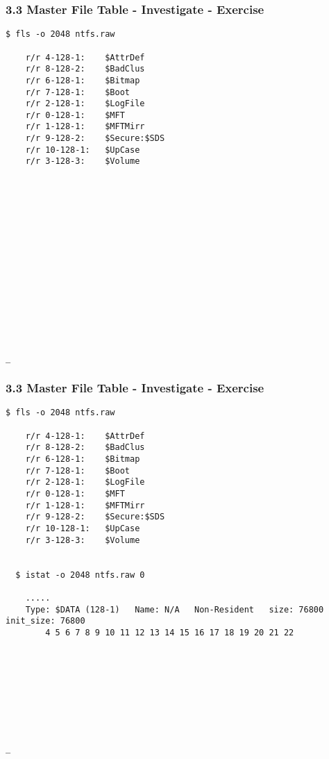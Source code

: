 \begin{frame}[fragile]
  \frametitle{3.3 Master File Table - Investigate - Exercise}
  \begin{lstlisting}[basicstyle=\tiny]
  $ fls -o 2048 ntfs.raw

	r/r 4-128-1:	$AttrDef
	r/r 8-128-2:	$BadClus
	r/r 6-128-1:	$Bitmap
	r/r 7-128-1:	$Boot
	r/r 2-128-1:	$LogFile
	r/r 0-128-1:	$MFT
	r/r 1-128-1:	$MFTMirr
	r/r 9-128-2:	$Secure:$SDS
	r/r 10-128-1:	$UpCase
	r/r 3-128-3:	$Volume
















_
  \end{lstlisting}
\end{frame}


\begin{frame}[fragile]
  \frametitle{3.3 Master File Table - Investigate - Exercise}
  \begin{lstlisting}[basicstyle=\tiny]
  $ fls -o 2048 ntfs.raw

	r/r 4-128-1:	$AttrDef
	r/r 8-128-2:	$BadClus
	r/r 6-128-1:	$Bitmap
	r/r 7-128-1:	$Boot
	r/r 2-128-1:	$LogFile
	r/r 0-128-1:	$MFT
	r/r 1-128-1:	$MFTMirr
	r/r 9-128-2:	$Secure:$SDS
	r/r 10-128-1:	$UpCase
	r/r 3-128-3:	$Volume


  $ istat -o 2048 ntfs.raw 0

	.....
	Type: $DATA (128-1)   Name: N/A   Non-Resident   size: 76800  init_size: 76800
        4 5 6 7 8 9 10 11 12 13 14 15 16 17 18 19 20 21 22









_
  \end{lstlisting}
\end{frame}


